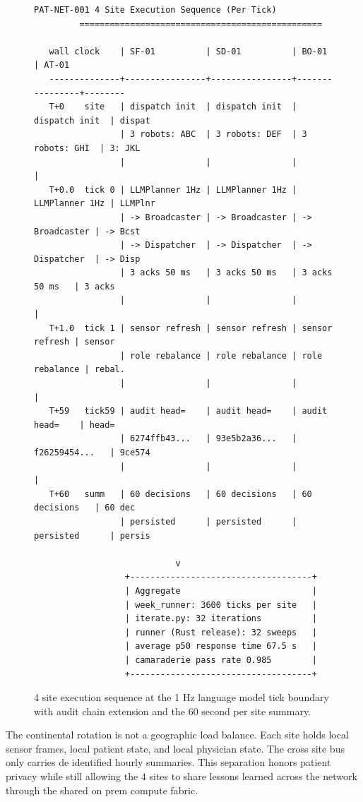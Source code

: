 \begin{sectionaccent}
\begin{figure}[H]
\centering
\begin{Verbatim}[fontsize=\footnotesize]
         PAT-NET-001 4 Site Execution Sequence (Per Tick)
         ================================================

   wall clock    | SF-01          | SD-01          | BO-01          | AT-01
   --------------+----------------+----------------+----------------+--------
   T+0    site   | dispatch init  | dispatch init  | dispatch init  | dispat
                 | 3 robots: ABC  | 3 robots: DEF  | 3 robots: GHI  | 3: JKL
                 |                |                |                |
   T+0.0  tick 0 | LLMPlanner 1Hz | LLMPlanner 1Hz | LLMPlanner 1Hz | LLMPlnr
                 | -> Broadcaster | -> Broadcaster | -> Broadcaster | -> Bcst
                 | -> Dispatcher  | -> Dispatcher  | -> Dispatcher  | -> Disp
                 | 3 acks 50 ms   | 3 acks 50 ms   | 3 acks 50 ms   | 3 acks
                 |                |                |                |
   T+1.0  tick 1 | sensor refresh | sensor refresh | sensor refresh | sensor
                 | role rebalance | role rebalance | role rebalance | rebal.
                 |                |                |                |
   T+59   tick59 | audit head=    | audit head=    | audit head=    | head=
                 | 6274ffb43...   | 93e5b2a36...   | f26259454...   | 9ce574
                 |                |                |                |
   T+60   summ   | 60 decisions   | 60 decisions   | 60 decisions   | 60 dec
                 | persisted      | persisted      | persisted      | persis

                            v
                  +------------------------------------+
                  | Aggregate                          |
                  | week_runner: 3600 ticks per site   |
                  | iterate.py: 32 iterations          |
                  | runner (Rust release): 32 sweeps   |
                  | average p50 response time 67.5 s   |
                  | camaraderie pass rate 0.985        |
                  +------------------------------------+
\end{Verbatim}
\caption{4 site execution sequence at the 1 Hz language model tick boundary with audit chain extension and the 60 second per site summary.}
\label{fig:execution-sequence}
\end{figure}

The continental rotation is not a geographic load balance. Each site
holds local sensor frames, local patient state, and local physician
state. The cross site bus only carries de identified hourly
summaries. This separation honors patient privacy while still allowing
the 4 sites to share lessons learned across the network through the
shared on prem compute fabric.


\end{sectionaccent}
